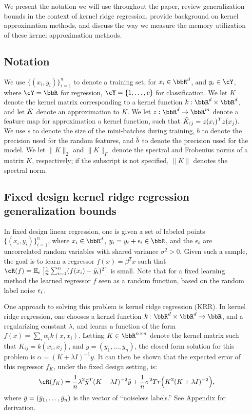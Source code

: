 We present the notation we will use throughout the paper, review generalization bounds in the context of kernel ridge regression, provide background on kernel approximation methods, and discuss the way we measure the memory utilization of these kernel approximation methods.

\subsection{Notation}
We use $\{(x_i,y_i)\}_{i=1}^n$ to denote a training set, for $x_i \in \RR^d$, and $y_i \in \cY$, where $\cY = \RR$ for regression, $\cY = \{1,\ldots,c\}$ for classification.  We let $K$ denote the kernel matrix corresponding to a kernel function $k:\RR^d\times\RR^d$, and let $\tilde{K}$ denote an approximation to $K$. We let $z:\RR^d\rightarrow\RR^m$ denote a feature map for approximation a kernel function, such that $\tilde{K}_{ij} = z(x_i)^T z(x_j)$.  We use $s$ to denote the size of the mini-batches during training, $b$ to denote the precision used for the random features, and $\hat{b}$ to denote the precision used for the model.  We let $\|K\|_2$ and $\|K\|_F$ denote the spectral and Frobenius norms of a matrix $K$, respectively; if the subscript is not specified, $\|K\|$ denotes the spectral norm.

\subsection{Fixed design kernel ridge regression generalization bounds}
In fixed design linear regression, one is given a set of labeled points $\{(x_i,y_i)\}_{i=1}^n$, where $x_i \in \RR^d$, $y_i = \by_i + \eps_i \in \RR$, and the $\epsilon_i$ are uncorrelated random variables with shared variance $\sigma^2 > 0$.  Given such a sample, the goal is to learn a regressor $f(x) = \beta^T x$ such that $\cR(f) = \expect{\eps}{\frac{1}{n}\sum_{i=1}^n (f(x_i) - \by_i)^2}$ is small. Note that for a fixed learning method the learned regressor $f$ seen as a random function, based on the random label noise $\epsilon_i$.

One approach to solving this problem is kernel ridge regression (KRR).  In kernel ridge regression, one chooses a kernel function $k:\RR^d\times\RR^d\rightarrow \RR$, and a regularizing constant $\lambda$, and learns a function of the form $f(x) = \sum_i \alpha_i k(x,x_i)$.  Letting $K\in\RR^{n\times n}$ denote the kernel matrix such that $K_{ij} = k(x_i,x_j)$, and $y = (y_1,\ldots,y_n)$, the closed form solution for this problem is $\alpha = (K+\lambda I)^{-1}y$. It can then be shown that the expected error of this regressor $f_K$, under the fixed design setting, is:
\begin{eqnarray}
\cR(f_K) = \frac{1}{n}\lambda^2 \by^T(K+\lambda I)^{-2}\by + \frac{1}{n}\sigma^2 Tr\Big(K^2(K+\lambda \id)^{-2}\Big),
\end{eqnarray}
where $\bar{y} = (\bar{y}_1,\ldots,\bar{y}_n)$ is the vector of ``noiseless labels.'' See Appendix  for derivation.

